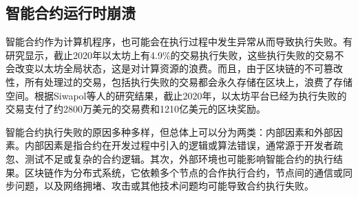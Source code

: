 \begin{enumerate}[label=(\arabic*)]
    
    
\end{enumerate}
\subsection{智能合约运行时崩溃}
\label{sec:智能合约运行时崩溃}
智能合约作为计算机程序，也可能会在执行过程中发生异常从而导致执行失败。有研究显示\cite{reducing2020}，截止2020年以太坊上有4.9\%的交易执行失败，这些执行失败的交易不会改变以太坊全局状态，这是对计算资源的浪费。而且，由于区块链的不可篡改性，所有处理过的交易，包括执行失败的交易都会永久存储在区块上，浪费了存储空间。根据Siwapol等人的研究结果\cite{reducing2020}，截止2020年，以太坊平台已经为执行失败的交易支付了约2800万美元的交易费和1210亿美元的区块奖励。

智能合约执行失败的原因多种多样，但总体上可以分为两类：内部因素和外部因素。内部因素是指合约在开发过程中引入的逻辑或算法错误，通常源于开发者疏忽、测试不足或复杂的合约逻辑。其次，外部环境也可能影响智能合约的执行结果。区块链作为分布式系统，它依赖多个节点的合作执行合约，节点间的通信或同步问题，以及网络拥堵、攻击或其他技术问题均可能导致合约执行失败。

